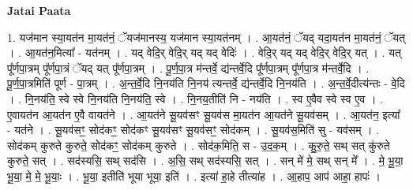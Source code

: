 \documentclass[17pt]{extarticle}
\begin{document}
\textbf{Jatai Paata} \newline

1. यज॑मान स्या॒यत॑न मा॒यत॑नं॒ ॅयज॑मानस्य॒ यज॑मान स्या॒यत॑नम् । . आ॒यत॑नं॒ ॅयद् यदा॒यत॑न मा॒यत॑नं॒ ॅयत् । . आ॒यत॑न॒मित्या᳚ - यत॑नम् । . यद् वेदि॒र् वेदि॒र् यद् यद् वेदिः॑ । . वेदि॒र् यद् यद् वेदि॒र् वेदि॒र् यत् । . यत् पू᳚र्णपा॒त्रम् पू᳚र्णपा॒त्रं ॅयद् यत् पू᳚र्णपा॒त्रम् । . पू॒र्ण॒पा॒त्र म॑न्तर्वे॒ द्य॑न्तर्वे॒दि पू᳚र्णपा॒त्रम् पू᳚र्णपा॒त्र म॑न्तर्वे॒दि । . पू॒र्ण॒पा॒त्रमिति॑ पूर्ण - पा॒त्रम् । . अ॒न्त॒र्वे॒दि नि॒नय॑ति नि॒नय॑ त्यन्तर्वे॒ द्य॑न्तर्वे॒दि नि॒नय॑ति । . अ॒न्त॒र्वे॒दीत्य॑न्तः - वे॒दि । . नि॒नय॑ति॒ स्वे स्वे नि॒नय॑ति नि॒नय॑ति॒ स्वे । . नि॒नय॒तीति॑ नि - नय॑ति । . स्व ए॒वैव स्वे स्व ए॒व । . ए॒वायत॑न आ॒यत॑न ए॒वै वायत॑ने । . आ॒यत॑ने सू॒यव॑सꣳ सू॒यव॑स मा॒यत॑न आ॒यत॑ने सू॒यव॑सम् । . आ॒यत॑न॒ इत्या᳚ - यत॑ने । . सू॒यव॑सꣳ॒॒ सोद॑कꣳ॒॒ सोद॑कꣳ सू॒यव॑सꣳ सू॒यव॑सꣳ॒॒ सोद॑कम् । . सू॒यव॑स॒मिति॑ सु - यव॑सम् । . सोद॑कम् कुरुते कुरुते॒ सोद॑कꣳ॒॒ सोद॑कम् कुरुते । . सोद॑क॒मिति॒ स - उ॒द॒क॒म् । . कु॒रु॒ते॒ सथ् सत् कु॑रुते कुरुते॒ सत् । . सद॑स्यसि॒ सथ् सद॑सि । . अ॒सि॒ सथ् सद॑स्यसि॒ सत् । . सन् मे॑ मे॒ सथ् सन् मे᳚ । . मे॒ भू॒या॒ भू॒या॒ मे॒ मे॒ भू॒याः॒ । . भू॒या॒ इतीति॑ भूया भूया॒ इति॑ । . इत्या॑ हा॒हे तीत्या॑ह । . आ॒हाप॒ आप॑ आहा॒ हापः॑ । \newline
\end{document}
